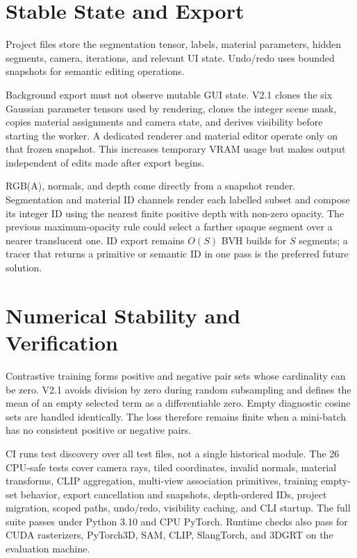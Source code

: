 \documentclass[10pt,twocolumn,a4paper]{article}
\begin{document}
\section{Stable State and Export}
Project files store the segmentation tensor, labels, material parameters,
hidden segments, camera, iterations, and relevant UI state.
Undo/redo uses bounded snapshots for semantic editing operations.

Background export must not observe mutable GUI state. V2.1 clones the six
Gaussian parameter tensors used by rendering, clones the integer scene mask,
copies material assignments and camera state, and derives visibility before
starting the worker. A dedicated renderer and material editor operate only on
that frozen snapshot. This increases temporary VRAM usage but makes output
independent of edits made after export begins.

RGB(A), normals, and depth come directly from a snapshot render. Segmentation
and material ID channels render each labelled subset and compose its integer ID
using the nearest finite positive depth with non-zero opacity. The previous
maximum-opacity rule could select a farther opaque segment over a nearer
translucent one. ID export remains $O(S)$ BVH builds for $S$ segments; a tracer
that returns a primitive or semantic ID in one pass is the preferred future
solution.

\section{Numerical Stability and Verification}
Contrastive training forms positive and negative pair sets whose cardinality
can be zero. V2.1 avoids division by zero during random subsampling and defines
the mean of an empty selected term as a differentiable zero. Empty diagnostic
cosine sets are handled identically. The loss therefore remains finite when a
mini-batch has no consistent positive or negative pairs.

CI runs test discovery over all test files, not a single historical module.
The 26 CPU-safe tests cover camera rays, tiled coordinates, invalid normals,
material transforms, CLIP aggregation, multi-view association primitives,
training empty-set behavior, export cancellation and snapshots, depth-ordered
IDs, project migration, scoped paths, undo/redo, visibility caching, and CLI
startup. The full suite passes under Python 3.10 and CPU PyTorch. Runtime checks
also pass for CUDA rasterizers, PyTorch3D, SAM, CLIP, SlangTorch, and 3DGRT on
the evaluation machine.
\end{document}
